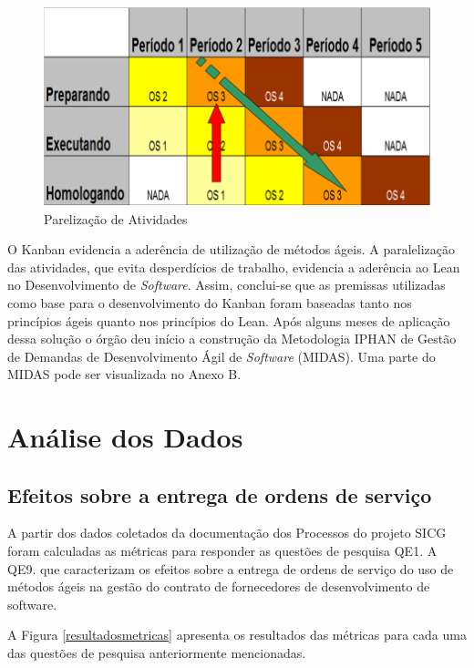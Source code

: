 \begin{figure}[H]
		\centering
		
			\includegraphics[scale=0.5]{figuras/kanbanIPHAN5.png}
		\caption{Parelização de Atividades \cite{parente}}
		\label{kanban5}
\end{figure}

O Kanban evidencia a aderência de utilização de métodos ágeis. A paralelização das atividades, que evita desperdícios de trabalho, evidencia a aderência ao Lean no Desenvolvimento de \textit{Software}. Assim, conclui-se que as premissas utilizadas como base para o desenvolvimento do Kanban foram baseadas tanto nos princípios ágeis quanto nos princípios do Lean. Após alguns meses de aplicação dessa solução o órgão deu início a construção da Metodologia IPHAN de Gestão de Demandas de Desenvolvimento Ágil de \textit{Software} (MIDAS). Uma parte do MIDAS pode ser visualizada no Anexo B. 



\section[Análise dos Dados]{Análise dos Dados}

\subsection[Efeitos sobre a entrega de ordens de serviço]{Efeitos sobre a entrega de ordens de serviço}

A partir dos dados coletados da documentação dos Processos do projeto SICG foram calculadas as métricas para responder as questões de pesquisa QE1. A QE9. que caracterizam os efeitos sobre a entrega de ordens de serviço do uso de métodos ágeis na gestão do contrato de fornecedores de desenvolvimento de software.

A Figura \ref{resultadosmetricas} apresenta os resultados das métricas para cada uma das questões de pesquisa anteriormente mencionadas.

